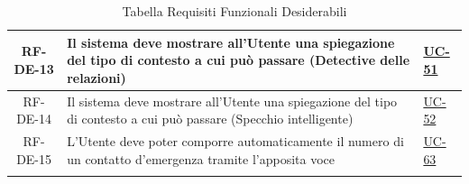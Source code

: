 \documentclass[a4paper,12pt]{article}
\begin{document}
\begin{center}
\begin{longtable}{|c|p{8.5cm}|>{\centering\arraybackslash}p{4cm}|}
\hline
\rowcolor{white}
RF-DE-13 & Il sistema deve mostrare all'Utente una spiegazione del tipo di contesto a cui può passare (Detective delle relazioni) & \hyperref[sec:UC-51]{UC-51} \\
\hline
\rowcolor{gray!20}
RF-DE-14 & Il sistema deve mostrare all'Utente una spiegazione del tipo di contesto a cui può passare (Specchio intelligente) & \hyperref[sec:UC-52]{UC-52} \\
\hline
\rowcolor{white}
RF-DE-15 & L'Utente deve poter comporre automaticamente il numero di un contatto d'emergenza tramite l'apposita voce & \hyperref[sec:UC-63]{UC-63} \\
\hline


\caption{Tabella Requisiti Funzionali Desiderabili} \label{tab:requisiti_funzionali_desiderabili} \\
\end{longtable}
\end{center}

\end{document}
